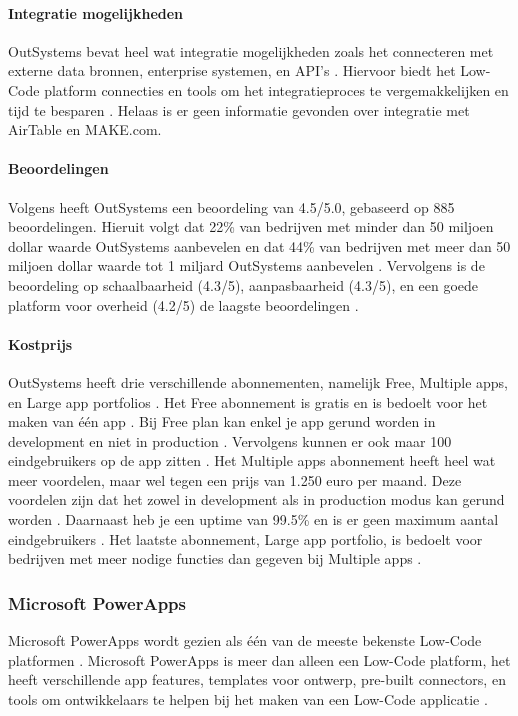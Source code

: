 \paragraph{Integratie mogelijkheden}
OutSystems bevat heel wat integratie mogelijkheden zoals het connecteren met externe data bronnen, enterprise systemen, en API's \autocite{Payne2023}.
Hiervoor biedt het Low-Code platform connecties en tools om het integratieproces te vergemakkelijken en tijd te besparen \autocite{Payne2023}. Helaas
is er geen informatie gevonden over integratie met AirTable en MAKE.com.

\paragraph{Beoordelingen}
Volgens \textcite{Gartner2024} heeft OutSystems een beoordeling van 4.5/5.0, gebaseerd op 885 beoordelingen. 
Hieruit volgt dat 22\% van bedrijven met minder dan 50 miljoen dollar waarde OutSystems aanbevelen en dat 44\% van bedrijven met meer dan 50 miljoen dollar waarde tot 1 miljard OutSystems aanbevelen \autocite{Gartner2024}.
Vervolgens is de beoordeling op schaalbaarheid (4.3/5), aanpasbaarheid (4.3/5), en een goede platform voor overheid (4.2/5) de laagste beoordelingen \autocite{Gartner2024}.

\paragraph{Kostprijs}
OutSystems heeft drie verschillende abonnementen, namelijk Free, Multiple apps, en Large app portfolios \autocite{OutSystems}. Het Free abonnement is gratis en is bedoelt voor het maken van één app \autocite{OutSystems}.
Bij Free plan kan enkel je app gerund worden in development en niet in production \autocite{OutSystems}. Vervolgens kunnen er ook maar 100 eindgebruikers op de app zitten \autocite{OutSystems}.
Het Multiple apps abonnement heeft heel wat meer voordelen, maar wel tegen een prijs van 1.250 euro per maand. Deze voordelen zijn dat het zowel in development als in production modus kan gerund worden \autocite{OutSystems}.
Daarnaast heb je een uptime van 99.5\% en is er geen maximum aantal eindgebruikers \autocite{OutSystems}. Het laatste abonnement, Large app portfolio, is bedoelt voor bedrijven met meer nodige functies dan gegeven bij Multiple apps \autocite{OutSystems}. 
\subsubsection*{Microsoft PowerApps}
Microsoft PowerApps wordt gezien als één van de meeste bekenste Low-Code platformen \autocite{Nguyen} \autocite{Gupta2023}.
Microsoft PowerApps is meer dan alleen een Low-Code platform, het heeft verschillende app features, templates voor ontwerp, pre-built connectors, en tools om ontwikkelaars te helpen bij het maken van een Low-Code applicatie \autocite{Nguyen}.

